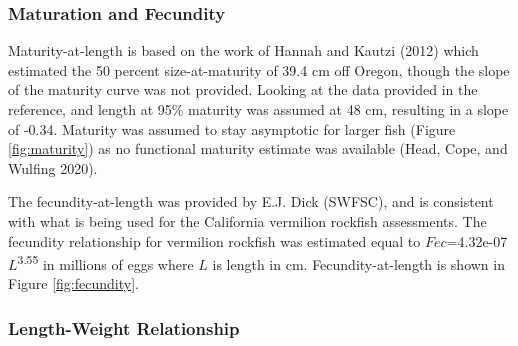 \documentclass[11pt,
  english,
  a4paper,
]{article}
\begin{document}
\leavevmode\tagmcend\tagstructend\par


\hypertarget{maturation-and-fecundity}{%
\subsubsection{Maturation and Fecundity}\label{maturation-and-fecundity}}

\leavevmode\tagmcend\tagstructend


Maturity-at-length is based on the work of Hannah and Kautzi {(2012)\leavevmode\tagmcend\tagstructend} which estimated the 50 percent size-at-maturity of 39.4 cm off Oregon, though the slope of the maturity curve was not provided. Looking at the data provided in the reference, and length at 95\% maturity was assumed at 48 cm, resulting in a slope of -0.34. Maturity was assumed to stay asymptotic for larger fish (Figure \ref{fig:maturity}) as no functional maturity estimate was available {(Head, Cope, and Wulfing 2020)\leavevmode\tagmcend\tagstructend}.

\leavevmode\tagmcend\tagstructend\par


The fecundity-at-length was provided by E.J. Dick (SWFSC), and is consistent with what is being used for the California vermilion rockfish assessments. The fecundity relationship for vermilion rockfish was estimated equal to {\(Fec\)\leavevmode\tagmcend\tagstructend}=4.32e-07{\(L\)\leavevmode\tagmcend\tagstructend}\textsuperscript{3.55} in millions of eggs where {\(L\)\leavevmode\tagmcend\tagstructend} is length in cm. Fecundity-at-length is shown in Figure \ref{fig:fecundity}.

\leavevmode\tagmcend\tagstructend\par


\hypertarget{length-weight-relationship}{%
\subsubsection{Length-Weight Relationship}\label{length-weight-relationship}}
\end{document}
